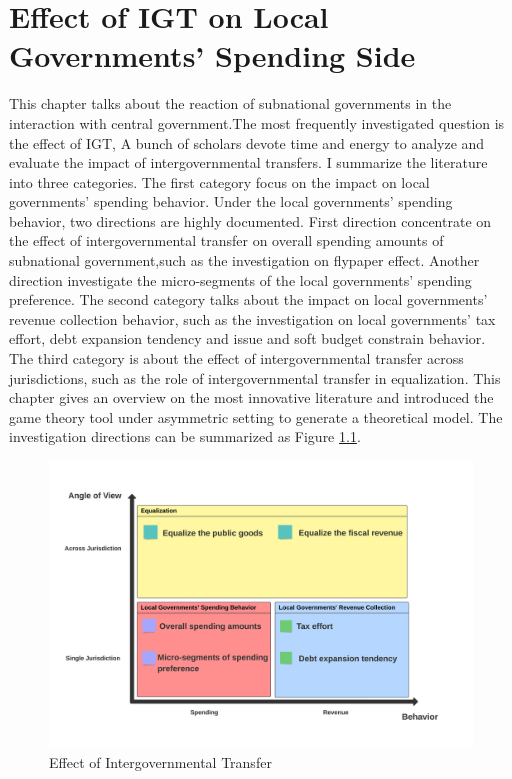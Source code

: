 
\chapter{Effect of IGT on Local Governments' Spending Side}
This chapter talks about the reaction of subnational governments in the interaction with central government.The most frequently investigated question is the effect of IGT, A bunch of scholars devote time and energy to analyze and evaluate the impact of intergovernmental transfers. I summarize the literature into three categories. The first category focus on the impact on local governments' spending behavior. Under the local governments' spending behavior, two directions are highly documented. First direction concentrate on the effect of intergovernmental transfer on overall spending amounts of subnational government,such as the investigation on flypaper effect. Another direction investigate the micro-segments of the local governments' spending preference. The second category talks about the impact on local governments' revenue collection behavior, such as the investigation on local governments' tax effort, debt expansion tendency and issue and soft budget constrain behavior. The third category is about the effect of intergovernmental transfer across jurisdictions, such as the role of intergovernmental transfer in equalization. This chapter gives an overview on the most innovative literature and introduced the game theory tool under asymmetric setting to generate a theoretical model. The investigation directions can be summarized as Figure \ref*{Figure 3.1}.



\begin{figure}[H]
    \centering
    \includegraphics[scale=0.4]{Chapter-4/Figures/Effect of Intergovernmental Transfer.jpeg}
    \caption{Effect of Intergovernmental Transfer
        \texttt{} }
    \label{Figure 3.1}
\end{figure}




